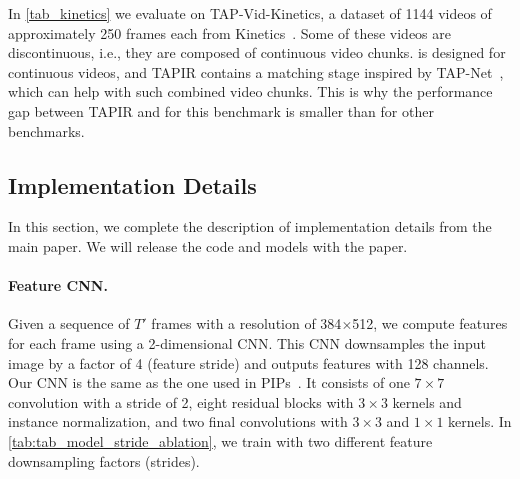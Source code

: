 In \cref{tab_kinetics} we evaluate \method on TAP-Vid-Kinetics, a dataset of 1144 videos of approximately 250 frames each from Kinetics~\cite{carreira2017quo}.
Some of these videos are discontinuous, i.e., they are composed of continuous video chunks.
\method is designed for continuous videos, and TAPIR contains a matching stage inspired by TAP-Net~\cite{tapvid}, which can help with such combined video chunks.
This is why the performance gap between TAPIR and \method for this benchmark is smaller than for other benchmarks.

\begin{table}[tb]
    \begin{minipage}{.47\linewidth}
        \centering
        \setlength\tabcolsep{0.9pt}
        

    \end{minipage}%
    \hspace{0.02\linewidth}
    \begin{minipage}{0.5\linewidth}
        \centering
        \setlength\tabcolsep{1pt}
        
    \end{minipage}
\end{table}
\begin{figure}[tb]
    \begin{minipage}{.47\linewidth}
        \centering
        \setlength\tabcolsep{0.9pt}
       
    \end{minipage}%
    \hspace{0.02\linewidth}
    \begin{minipage}{0.5\linewidth}
        \centering
        \setlength\tabcolsep{1pt}
        
    \end{minipage}
\end{figure}
\subsection{Implementation Details}

In this section, we complete the description of implementation details from the main paper.
We will release the code and models with the paper.

\paragraph{Feature CNN.}

Given a sequence of $T'$ frames with a resolution of 384$\times$512, we compute features for each frame using a 2-dimensional CNN\@.
This CNN downsamples the input image by a factor of 4 (feature stride) and outputs features with 128 channels.
Our CNN is the same as the one used in PIPs~\cite{pips}.
It consists of one $7\times 7$ convolution with a stride of 2, eight residual blocks with $3\times 3$ kernels and instance normalization, and two final convolutions with $3\times 3$ and $1 \times 1$ kernels.
In \cref{tab:tab_model_stride_ablation}, we train \method with two different feature downsampling factors (strides).

